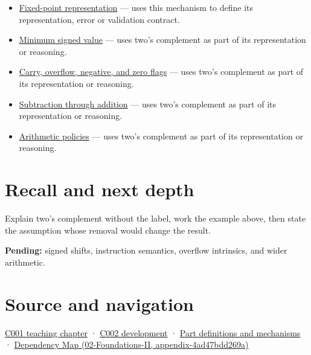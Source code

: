 \begin{itemize}
\item
  \hyperref[appendix-1d0dbe8924cc]{Fixed-point representation} --- uses this mechanism to define its representation, error or validation contract.
\item
  \hyperref[appendix-05f39b10364d]{Minimum signed value} --- uses two's complement as part of its representation or reasoning.
\item
  \hyperref[appendix-8d687c9c08ab]{Carry, overflow, negative, and zero flags} --- uses two's complement as part of its representation or reasoning.
\item
  \hyperref[appendix-1c7df340573e]{Subtraction through addition} --- uses two's complement as part of its representation or reasoning.
\item
  \hyperref[appendix-2ed044358b82]{Arithmetic policies} --- uses two's complement as part of its representation or reasoning.
\end{itemize}

\section{Recall and next depth}\label{appendix-4fbc03d20829-recall-and-next-depth}

Explain two's complement without the label, work the example above, then state the assumption whose removal would change the result.

\textbf{Pending:} signed shifts, instruction semantics, overflow intrinsics, and wider arithmetic.

\section{Source and navigation}\label{appendix-4fbc03d20829-source-and-navigation}

\href{Continuous\%20Notes/Computing\%20Foundations\%20-\%20From\%20Bits\%20to\%20C++\%20and\%20Systems\%20APIs\#From\%20a\%20signal\%20to\%20an\%20interpretation}{C001 teaching chapter} · \href{Continuous\%20Notes/Computing\%20Foundations\%20-\%20From\%20Bits\%20to\%20C++\%20and\%20Systems\%20APIs\#Arithmetic\%20becomes\%20a\%20policy}{C002 development} · \hyperref[appendix-fd090d982a15]{Part definitions and mechanisms} · \href{../02-Foundations-II/main.pdf\#nameddest=appendix-4ad47bdd269a}{Dependency Map (02-Foundations-II, appendix-4ad47bdd269a)}
